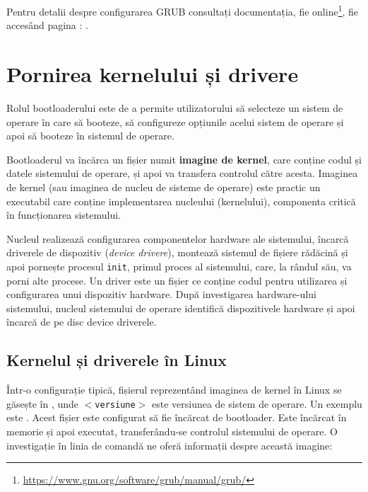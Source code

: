 Pentru detalii despre configurarea GRUB consultați documentația, fie online\footnote{\url{https://www.gnu.org/software/grub/manual/grub/}}, fie accesând pagina : .

\section{Pornirea kernelului și drivere}
\label{sec:boot:os}

Rolul bootloaderului este de a permite utilizatorului să selecteze un sistem de
operare în care să booteze, să configureze opțiunile acelui sistem de operare și
apoi să booteze în sistemul de operare.

Bootloaderul va încărca un fișier numit \textbf{imagine de kernel}, care conține codul
și datele sistemului de operare, și apoi va transfera controlul către acesta. Imaginea de
kernel (sau imaginea de nucleu de sisteme de operare) este practic un executabil
care conține implementarea nucleului (kernelului), componenta critică în
funcționarea sistemului.

Nucleul realizează configurarea componentelor hardware ale sistemului, încarcă
driverele de dispozitiv (\textit{device drivere}), montează sistemul de fișiere rădăcină
și apoi pornește procesul \texttt{init}, primul proces al sistemului, care, la rândul său,
va porni alte procese. Un driver este un fișier ce conține codul
pentru utilizarea și configurarea unui dispozitiv hardware. După investigarea
hardware-ului sistemului, nucleul sistemului de operare identifică dispozitivele
hardware și apoi încarcă de pe disc device driverele.

\subsection{Kernelul și driverele în Linux}
\label{sec:boot:os-linux}

Într-o configurație tipică, fișierul reprezentând imaginea de kernel în Linux se
găsește în , unde \texttt{$<$versiune$>$} este versiunea de sistem de
operare. Un exemplu este . Acest fișier este
configurat să fie încărcat de bootloader. Este încărcat în memorie și apoi
executat, transferându-se controlul sistemului de operare. O investigație în
linia de comandă ne oferă informații despre această imagine:


